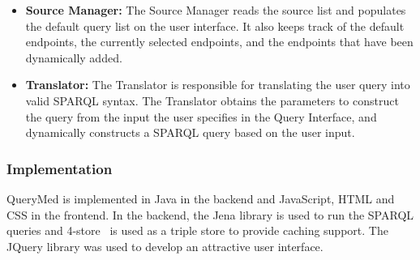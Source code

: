 \documentclass{www2010-submission}
\begin{document}
\begin{itemize}

\item \textbf{Source Manager:} The Source Manager reads the source list and populates the default query list on the user interface. It also keeps track of the default endpoints, the currently selected endpoints, and the endpoints that have been dynamically added.

\item \textbf{Translator:} The Translator is responsible for translating the user query into valid SPARQL syntax.  The Translator obtains the parameters to construct the query from the input the user specifies in the Query Interface, and dynamically constructs a SPARQL query based on the user input.



\end{itemize}

\subsubsection{Implementation}

QueryMed is implemented in Java in the backend and JavaScript, HTML and CSS in the frontend.  In the backend, the Jena library \cite{McBride} is used to run the SPARQL queries and 4-store~\cite{4store} is used as a triple store to provide caching support.  The JQuery library \cite{Resig} was used to develop an attractive user interface.   


\end{document}
